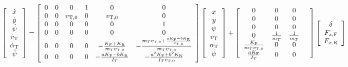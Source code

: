\documentclass[sublist,a4paper,twoside,11pt]{article}
\begin{document}
\begin{equation}
    \left[ \begin{array}{c} \dot{x} \\ \dot{y} \\ \dot{\psi} \\ \dot{v}_{\rm T} \\ \dot{\alpha}_{\rm T} \\ \ddot{\psi} \end{array} \right] = \left[ \begin{array}{cccccc} 0 & 0 & 0 & 1 & 0 & 0 \\ 0 & 0 & v_{{\rm T},0} & 0 & v_{{\rm T},0} & 0 \\ 0 & 0 & 0 & 0 & 0 & 1 \\ 0 & 0 & 0 & 0 & 0 & 0 \\ 0 & 0 & 0 & 0 & - \frac{K_{\rm F} + K_{\rm R}}{m_{T} v_{{\rm T},0}} & - \frac{m_{T} v_{{\rm T},0} + \frac{a K_{\rm F} - b K_{\rm R}}{v_{{\rm T},0}}}{m_{T} v_{{\rm T},0}} \\ 0 & 0 & 0 & 0 & - \frac{a K_{\rm F} - b K_{\rm R}}{I_{T}} & - \frac{a^2 K_{\rm F} + b^2 K_{\rm R}}{I_{T}  v_{{\rm T},0}} \end{array} \right] \left[ \begin{array}{c} x \\ y \\ \psi \\ v_{\rm T} \\ \alpha_{\rm T} \\ \dot{\psi} \end{array} \right] + \left[ \begin{array}{ccccc} 0 & 0 & 0 & \\ 0 & 0 & 0 & \\ 0 & 0 & 0 & \\ 0 & \frac{1}{m_{T}} & \frac{1}{m_{T}} & \\ \frac{K_{\rm F}}{m_{T} v_{{\rm T},0}} & 0 & 0 & \\  \frac{a K_{\rm F}}{I_{T}} & 0 & 0 \end{array} \right] \left[ \begin{array}{c} \delta \\ F_{x,{\rm F}} \\ F_{x,{\rm R}} \end{array} \right]
\end{equation}





\end{document}
